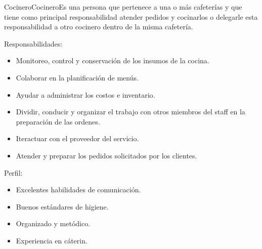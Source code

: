 \begin{Actor}{Cocinero}{Cocinero}{Es una persona que pertenece a una o más cafeterías y que tiene como principal responsabilidad atender pedidos y cocinarlos o delegarle esta responsabilidad a otro cocinero dentro de la misma cafetería.}
	
	\item[Responsabilidades:] \hspace{0.5cm}
		\begin{itemize}
			\item Monitoreo, control y conservación de los insumos de la cocina.
			
			\item Colaborar en la planificación de menús.
			
			\item Ayudar a administrar los costos e inventario.
			
			\item Dividir, conducir y organizar el trabajo con otros miembros del staff en la preparación de las ordenes.
			
			\item Iteractuar con el proveedor del servicio.
			
			\item Atender y preparar los pedidos solicitados por los clientes.
		\end{itemize}
	
	\item[Perfil:] \hspace{0.5cm}
		\begin{itemize}
			\item Excelentes habilidades de comunicación.
			
			\item Buenos estándares de higiene.
			
			\item Organizado y metódico.
			
			\item Experiencia en cáterin.
		\end{itemize}
	
	\end{Actor}
	
